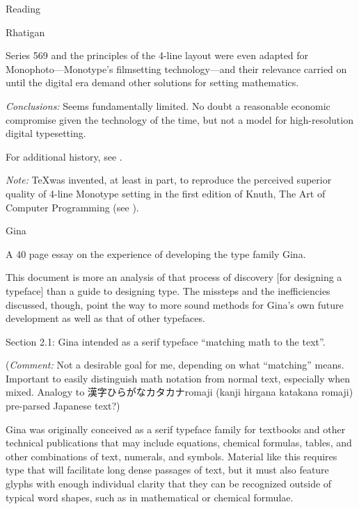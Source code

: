 \documentclass[11pt]{PalisadesLakesBook}
\begin{document}
\begin{plSection}{Reading}
\begin{plSection}{Rhatigan}
\begin{plSection}{}
\begin{plQuote}{}
{}
Series 569 and the principles of the 4-line layout 
were even adapted for Monophoto---Monotype's 
filmsetting technology---and their relevance carried on 
until the digital era demand other solutions 
for setting mathematics.
\end{plQuote}

\emph{Conclusions:}
Seems fundamentally limited. 
No doubt a reasonable economic compromise given the technology of
the time, but not a model for high-resolution digital typesetting.

For additional history, see
.

\emph{Note:} \TeX was invented, at least in part, 
to reproduce the perceived superior quality 
of 4-line Monotype setting
in the first edition of Knuth, The Art of Computer Programming
(see ).

\end{plSection}%
\begin{plSection}{Gina}

\begin{plSection}{}

A 40 page essay on the experience of developing the type family
Gina.

\begin{plQuote}{}{}
This document is more an analysis of that process of discovery
[for designing a typeface]
than a guide to designing type.
The missteps and the inefficiencies discussed, though, 
point the way to more sound methods for 
Gina's own future development as well as that of other typefaces.
\end{plQuote}

Section 2.1: Gina intended as a serif typeface 
``matching math to the text''.

(\emph{Comment:} Not a desirable goal for me, depending
on what ``matching'' means.
Important to easily distinguish math notation from normal text,
especially when mixed. 
Analogy to 漢字\allowbreak ひらがな\allowbreak カタカナ\allowbreak romaji
(kanji hirgana katakana romaji) pre-parsed Japanese text?)


\begin{plQuote}{}{}
Gina was originally conceived as a serif typeface family
for textbooks and other technical publications that may include
equations, chemical formulas, tables, and other combinations of
text, numerals, and symbols.
Material like this requires type that will facilitate long dense
passages of text, but it must also feature glyphs with enough
individual clarity that they can be recognized outside of typical
word shapes, such as in mathematical or chemical formulae.
\end{plQuote}


\end{plSection}
\end{plSection}
\end{plSection}
\end{plSection}
\end{document}
